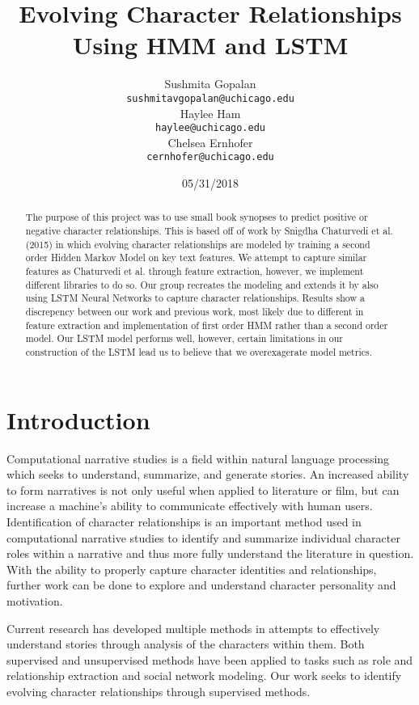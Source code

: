 \documentclass[11pt,a4paper]{article}
\title{Evolving Character Relationships Using HMM and LSTM}
\author{Sushmita Gopalan \\
  {\tt sushmitavgopalan@uchicago.edu} \\\And
  Haylee Ham \\
  {\tt haylee@uchicago.edu} \\\And
  Chelsea Ernhofer \\
  {\tt cernhofer@uchicago.edu} \\}
\date{05/31/2018}
\begin{document}
\maketitle
\begin{abstract}
  The purpose of this project was to use small book synopses to predict positive or negative character relationships. This is based off of work by Snigdha Chaturvedi et al. (2015) in which evolving character relationships are modeled by training a second order Hidden Markov Model on key text features. We attempt to capture similar features as Chaturvedi et al. through feature extraction, however, we implement different libraries to do so. Our group recreates the modeling and extends it by also using LSTM Neural Networks to capture character relationships. Results show a discrepency between our work and previous work, most likely due to different in feature extraction and implementation of first order HMM rather than a second order model. Our LSTM model performs well, however, certain limitations in our construction of the LSTM lead us to believe that we overexagerate model metrics.
\end{abstract}

\section{Introduction}

Computational narrative studies is a field within natural language processing which seeks to understand, summarize, and generate stories. An increased ability to form narratives is not only useful when applied to literature or film, but can increase a machine's ability to communicate effectively with human users. Identification of character relationships is an important method used in computational narrative studies to identify and summarize individual character roles within a narrative and thus more fully understand the literature in question. With the ability to properly capture character identities and relationships, further work can be done to explore and understand character personality and motivation.

Current research has developed multiple methods in attempts to effectively understand stories through analysis of the characters within them.  Both supervised and unsupervised methods have been applied to tasks such as role and relationship extraction and social network modeling. Our work seeks to identify evolving character relationships through supervised methods. 
\end{document}
